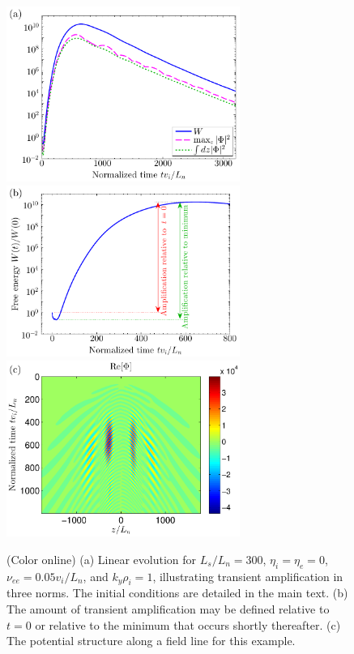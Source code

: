 \documentclass[12pt,superscriptaddress]{revtex4}
\newcommand{\nuee}{\nu_{ee}}
\begin{document}
\begin{figure}[h!]
\includegraphics[width=3in]{m20141119_01_plotGS2TransientAmplificationForPaper_figureA_a.pdf}
\includegraphics[width=3in]{m20141121_01_plotGS2TransientAmplificationForPaper_figuresBC_b.pdf}
\includegraphics[width=3in]{m20141121_01_plotGS2TransientAmplificationForPaper_figuresBC_c.pdf}
\caption{(Color online) (a) Linear evolution for $L_s/L_n=300$, $\eta_i = \eta_e = 0$,
$\nuee = 0.05 v_i/L_n$, and $k_y \rho_i = 1$, illustrating transient amplification in three norms.
The initial conditions are detailed in the main text.
(b) The amount of transient amplification may be defined relative to $t=0$ or relative
to the minimum that occurs shortly thereafter.
(c) The potential structure along a field line for this example.
\label{fig:transientAmplification}}
\end{figure}
\end{document}
